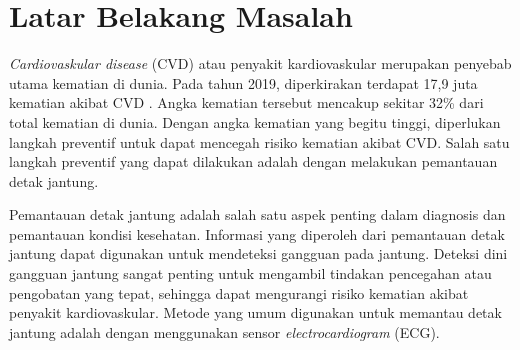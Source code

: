 
\section{Latar Belakang Masalah}

\emph{Cardiovaskular disease} (CVD) atau penyakit kardiovaskular merupakan penyebab utama kematian di dunia.
Pada tahun 2019, diperkirakan terdapat 17,9 juta kematian akibat CVD \parencite{worldhealthorganizationCardiovascularDiseasesCVDs2021}.
Angka kematian tersebut mencakup sekitar 32\% dari total kematian di dunia. 
Dengan angka kematian yang begitu tinggi, diperlukan langkah preventif untuk dapat mencegah risiko kematian akibat CVD.
Salah satu langkah preventif yang dapat dilakukan adalah dengan melakukan pemantauan detak jantung.


Pemantauan detak jantung adalah salah satu aspek penting dalam diagnosis dan pemantauan kondisi kesehatan.
Informasi yang diperoleh dari pemantauan detak jantung dapat digunakan untuk mendeteksi gangguan pada jantung.
Deteksi dini gangguan jantung sangat penting untuk mengambil tindakan pencegahan atau pengobatan yang tepat, sehingga dapat mengurangi risiko kematian akibat penyakit kardiovaskular.
Metode yang umum digunakan untuk memantau detak jantung adalah dengan menggunakan sensor \emph{electrocardiogram} (ECG).


